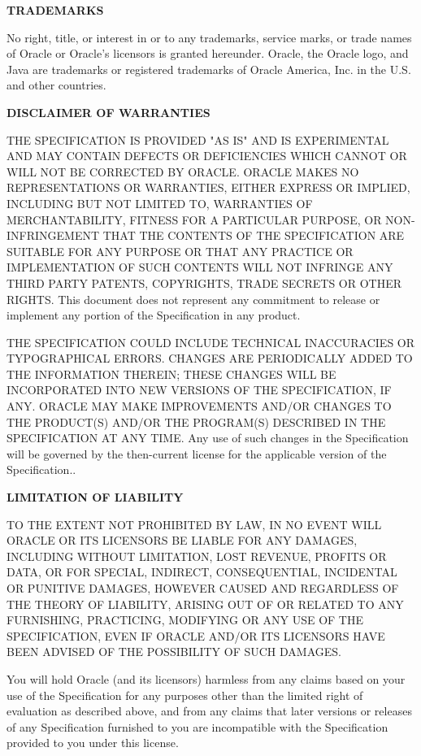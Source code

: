 \begin{flushleft}
\vspace{1em}
{\bfseries TRADEMARKS}

No right, title, or interest in or to any trademarks, service marks, or trade names of Oracle or Oracle's licensors is granted hereunder. Oracle, the Oracle logo, and Java are trademarks or registered trademarks of Oracle America, Inc. in the U.S. and other countries.

\vspace{1em}
{\bfseries DISCLAIMER OF WARRANTIES}

THE SPECIFICATION IS PROVIDED "AS IS" AND IS EXPERIMENTAL AND MAY CONTAIN DEFECTS OR DEFICIENCIES WHICH CANNOT OR WILL NOT BE CORRECTED BY ORACLE. ORACLE MAKES NO REPRESENTATIONS OR WARRANTIES, EITHER EXPRESS OR IMPLIED, INCLUDING BUT NOT LIMITED TO, WARRANTIES OF MERCHANTABILITY, FITNESS FOR A PARTICULAR PURPOSE, OR NON-INFRINGEMENT THAT THE CONTENTS OF THE SPECIFICATION ARE SUITABLE FOR ANY PURPOSE OR THAT ANY PRACTICE OR IMPLEMENTATION OF SUCH CONTENTS WILL NOT INFRINGE ANY THIRD PARTY PATENTS, COPYRIGHTS, TRADE SECRETS OR OTHER RIGHTS. This document does not represent any commitment to release or implement any portion of the Specification in any product.

THE SPECIFICATION COULD INCLUDE TECHNICAL INACCURACIES OR TYPOGRAPHICAL ERRORS. CHANGES ARE PERIODICALLY ADDED TO THE INFORMATION THEREIN; THESE CHANGES WILL BE INCORPORATED INTO NEW VERSIONS OF THE SPECIFICATION, IF ANY. ORACLE MAY MAKE IMPROVEMENTS AND/OR CHANGES TO THE PRODUCT(S) AND/OR THE PROGRAM(S) DESCRIBED IN THE SPECIFICATION AT ANY TIME. Any use of such changes in the Specification will be governed by the then-current license for the applicable version of the Specification..

\vspace{1em}
{\bfseries LIMITATION OF LIABILITY}

TO THE EXTENT NOT PROHIBITED BY LAW, IN NO EVENT WILL ORACLE OR ITS LICENSORS BE LIABLE FOR ANY DAMAGES, INCLUDING WITHOUT LIMITATION, LOST REVENUE, PROFITS OR DATA, OR FOR SPECIAL,
INDIRECT, CONSEQUENTIAL, INCIDENTAL OR PUNITIVE DAMAGES, HOWEVER CAUSED AND REGARDLESS OF THE THEORY OF LIABILITY, ARISING OUT OF OR RELATED TO ANY FURNISHING, PRACTICING, MODIFYING OR ANY USE OF THE SPECIFICATION, EVEN IF ORACLE AND/OR ITS LICENSORS HAVE BEEN ADVISED OF THE POSSIBILITY OF SUCH DAMAGES.

You will hold Oracle (and its licensors) harmless from any claims based on your use of the Specification for any purposes other than the limited right of evaluation as described above, and from any claims that later versions or releases of any Specification furnished to you are incompatible with the Specification provided to you under this license.


\end{flushleft}
